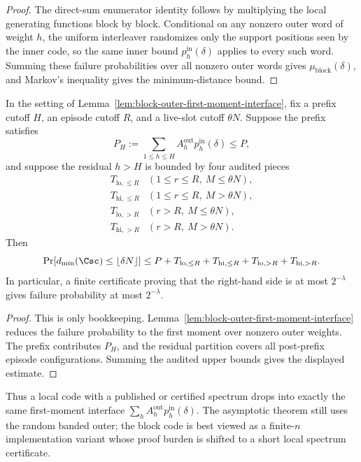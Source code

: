 \begin{proof}
The direct-sum enumerator identity follows by multiplying the local generating functions block by block.  Conditional
on any nonzero outer word of weight \(h\), the uniform interleaver randomizes only the support positions seen by the
inner code, so the same inner bound \(p_h^{\mathrm{in}}(\delta)\) applies to every such word.  Summing these failure
probabilities over all nonzero outer words gives \(\mu_{\mathrm{block}}(\delta)\), and Markov's inequality gives the
minimum-distance bound.
\end{proof}

\begin{lemma}
\label{lem:finite-block-certificate-template}
In the setting of Lemma~\ref{lem:block-outer-first-moment-interface}, fix a prefix cutoff \(H\), an episode cutoff
\(R\), and a live-slot cutoff \(\theta N\).  Suppose the prefix satisfies
\[
P_H:=\sum_{1\le h\le H} A_h^{\mathrm{out}}p_h^{\mathrm{in}}(\delta)\le P,
\]
and suppose the residual \(h>H\) is bounded by four audited pieces
\[
\begin{array}{ll}
T_{\mathrm{lo},\le R} & (1\le r\le R,\ M\le\theta N),\\
T_{\mathrm{hi},\le R} & (1\le r\le R,\ M>\theta N),\\
T_{\mathrm{lo},>R} & (r>R,\ M\le\theta N),\\
T_{\mathrm{hi},>R} & (r>R,\ M>\theta N).
\end{array}
\]
Then
\[
\Pr[d_{\min}(\Csc)\le \lfloor\delta N\rfloor]
\le
P+T_{\mathrm{lo},\le R}+T_{\mathrm{hi},\le R}+T_{\mathrm{lo},>R}+T_{\mathrm{hi},>R}.
\]
In particular, a finite certificate proving that the right-hand side is at most \(2^{-\lambda}\) gives failure
probability at most \(2^{-\lambda}\).
\end{lemma}

\begin{proof}
This is only bookkeeping.  Lemma~\ref{lem:block-outer-first-moment-interface} reduces the failure probability to the
first moment over nonzero outer weights.  The prefix contributes \(P_H\), and the residual partition covers all
post-prefix episode configurations.  Summing the audited upper bounds gives the displayed estimate.
\end{proof}

Thus a local code with a published or certified spectrum drops into exactly the same first-moment interface
\(\sum_h A_h^{\mathrm{out}}p_h^{\mathrm{in}}(\delta)\).  The asymptotic theorem still uses the random banded outer; the
block code is best viewed as a finite-\(n\) implementation variant whose proof burden is shifted to a short local
spectrum certificate.

